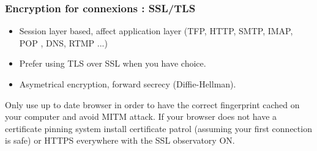 \begin{frame}
\frametitle{Encryption for connexions : SSL/TLS}
\begin{itemize}
\item Session layer based, affect application layer (TFP, HTTP, SMTP, IMAP, POP
, DNS, RTMP ...)
\item Prefer using TLS over SSL when you have choice.
\item Asymetrical encryption, forward secrecy (Diffie-Hellman).
\end{itemize}

Only use up to date browser in order to have the correct fingerprint cached
on your computer and avoid MITM attack.
If your browser does not have a certificate pinning system install
certificate patrol (assuming your first connection is safe) or HTTPS everywhere
with the SSL observatory ON.
\end{frame}

